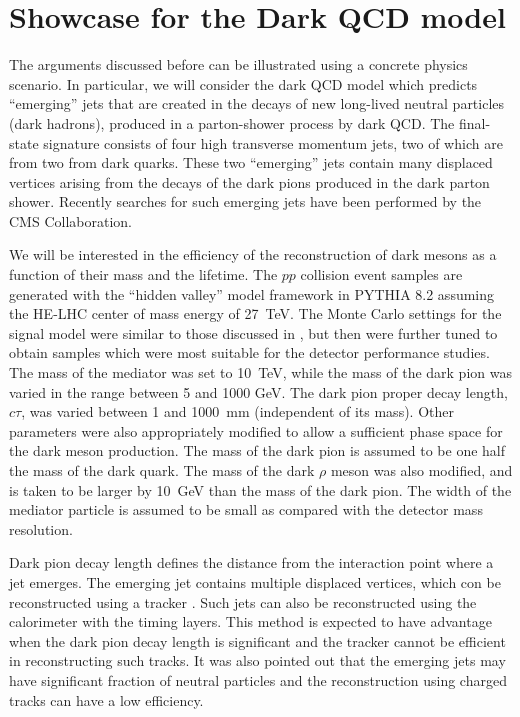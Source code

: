 \section{Showcase for the Dark QCD model}
\label{darksec}

The arguments discussed before can be illustrated using a concrete physics scenario.
In particular, we will consider the dark QCD model \cite{Bai:2013xga,Schwaller:2015gea} which predicts 
``emerging'' jets 
that are created in the decays of new long-lived neutral 
particles (dark hadrons), produced in a parton-shower process by dark QCD.
The final-state signature consists of four high transverse momentum jets, two of which 
are from two from dark quarks. These two ``emerging'' jets contain many displaced
vertices arising from the decays of the dark pions produced in the dark parton shower.
Recently searches for such emerging jets have been performed \cite{Sirunyan:2018njd} 
by the CMS Collaboration.

We will be interested in the efficiency of the reconstruction of dark mesons  as a function of their mass
and the lifetime.    
The $pp$ collision event samples  are generated with the ``hidden valley'' model framework in PYTHIA 8.2 assuming
the HE-LHC center of mass energy of 27~TeV. The Monte Carlo settings for the signal model were similar
to those discussed in  \cite{Sirunyan:2018njd}, but then were further tuned \cite{prive} to obtain samples  which were most suitable
for the detector performance studies. 
The mass of the mediator was set to 10~TeV, while the mass of the dark pion was varied in the range between 5 and 1000 GeV.
The dark pion proper decay length, $c\tau$,  was varied between 1 and 1000~mm (independent of its mass). Other parameters
were also appropriately modified to allow a sufficient phase space for the dark meson production.
The mass of the dark pion is assumed to be one half the mass of the dark quark. The mass of the dark
$\rho$  meson was also modified, and is taken to be larger by 10~GeV than the mass of the dark pion. The width of the
mediator particle is assumed to be small as compared with the detector mass resolution.

Dark pion decay length defines the distance from the interaction point where a jet emerges. The  emerging jet contains multiple displaced vertices,
which con be reconstructed using a tracker  \cite{Sirunyan:2018njd}. 
Such jets can also be reconstructed using the calorimeter  with the timing layers. This method is expected
to have advantage when the dark pion decay length is significant and the tracker cannot be efficient in reconstructing such tracks. 
It was also pointed out \cite{Schwaller:2015gea} that the emerging jets may have significant fraction of neutral particles and the reconstruction
using charged tracks can have a low efficiency.  

